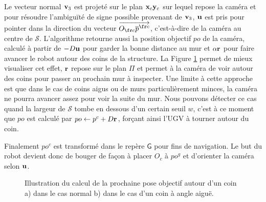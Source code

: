 Le vecteur normal $\mathbf{v}_3$ est projeté sur le plan $\mathbf{x}_c\mathbf{y}_c$ sur lequel repose la caméra et pour résoudre l'ambiguïté de signe possible provenant de $\mathbf{v}_3$, $\mathbf{u}$ est pris pour pointer dans la direction du vecteur $\overrightarrow{O_{\fr c} \overline{p}^{\fr c}}$, c'est-à-dire de la caméra au centre de $\mathcal{S}$. L'algorithme retourne aussi la position objectif ${po}$ de la caméra, calculé à partir de $-D\mathbf{u}$ pour garder la bonne distance au mur et $\alpha \mathbf{r}$ pour faire avancer le robot autour des coins de la structure. La Figure \ref{fig:ugv_goal_determination} permet de mieux visualiser cet effet, $\mathbf{r}$ repose sur le plan $\Pi$ et permet à la caméra de voir autour des coins pour passer au prochain mur à inspecter. Une limite à cette approche est que dans le cas de coins aigus ou de murs particulièrement minces, la caméra ne pourra avancer assez pour voir la suite du mur. Nous pouvons détecter ce cas quand la largeur de $\mathcal{S}$ tombe en dessous d'un certain seuil $w$, c'est à ce moment que ${po}$ est calculé par ${po} \gets p^c + D \mathbf{r}$, forçant ainsi l'UGV à tourner autour du coin.

Finalement ${po^c}$ est transformé dans le repère $\mathsf{G}$ pour fins de navigation. Le but du robot devient donc de bouger de façon à placer $O_c$ à ${po^g}$ et d'orienter la caméra selon $\mathbf{u}$.

\begin{figure}[ht]
  \centering
  \hfil
  \caption{
    Illustration du calcul de la prochaine pose objectif autour d'un coin a) dans le cas normal b) dans le cas d'un coin à angle aiguë.
  }
  \label{fig:ugv_goal_determination}
\end{figure}

